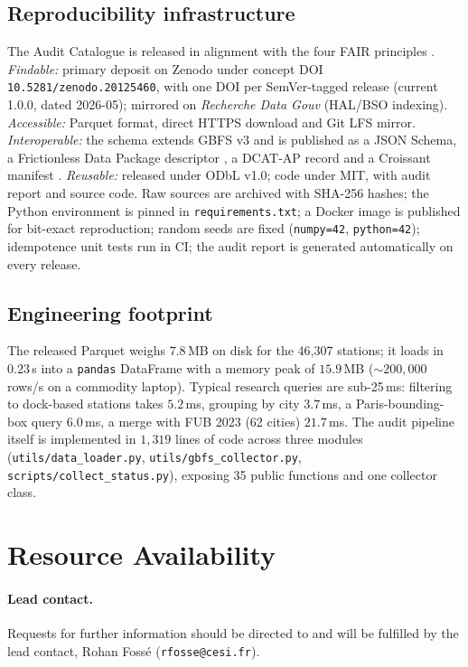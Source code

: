 \documentclass[11pt,a4paper]{article}
\begin{document}
\subsection{Reproducibility infrastructure}
The Audit Catalogue is released in alignment with the four FAIR
principles \cite{Wilkinson2016}. \emph{Findable:} primary deposit on
Zenodo under concept DOI \texttt{10.5281/zenodo.20125460}, with one
DOI per SemVer-tagged release (current 1.0.0, dated 2026-05); mirrored
on \emph{Recherche Data Gouv} (HAL/BSO indexing). \emph{Accessible:}
Parquet format, direct HTTPS download and Git LFS mirror.
\emph{Interoperable:} the schema extends GBFS v3 and is published as a
JSON Schema, a Frictionless Data Package descriptor
\cite{FrictionlessData2023}, a DCAT-AP record \cite{DCATAP2021} and a
Croissant manifest \cite{Croissant2024}. \emph{Reusable:} released
under ODbL v1.0; code under MIT, with audit report and source code.
Raw sources are archived with SHA-256 hashes; the Python environment
is pinned in \texttt{requirements.txt}; a Docker image is published
for bit-exact reproduction; random seeds are fixed (\texttt{numpy=42},
\texttt{python=42}); idempotence unit tests run in CI; the audit
report is generated automatically on every release.

\subsection{Engineering footprint}
The released Parquet weighs $7.8$\,MB on disk for the 46{,}307 stations;
it loads in $0.23$\,s into a \texttt{pandas} DataFrame with a memory
peak of $15.9$\,MB ($\sim 200{,}000$ rows/s on a commodity laptop).
Typical research queries are sub-25\,ms: filtering to dock-based
stations takes $5.2$\,ms, grouping by city $3.7$\,ms, a
Paris-bounding-box query $6.0$\,ms, a merge with FUB 2023 (62 cities)
$21.7$\,ms. The audit pipeline itself is implemented in $1{,}319$
lines of code across three modules (\texttt{utils/data\_loader.py},
\texttt{utils/gbfs\_collector.py}, \texttt{scripts/collect\_status.py}),
exposing 35 public functions and one collector class.

\section*{Resource Availability}

\paragraph{Lead contact.} Requests for further information should be
directed to and will be fulfilled by the lead contact, Rohan Foss\'e
(\texttt{rfosse@cesi.fr}).
\end{document}
